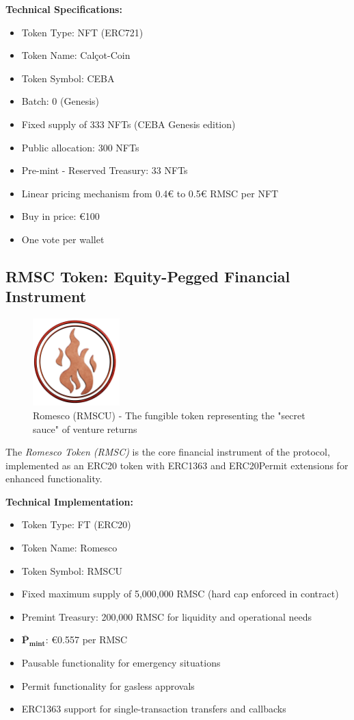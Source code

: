 \documentclass[conference]{IEEEtran}
\begin{document}
\textbf{Technical Specifications:}
\begin{itemize}
    \item Token Type: NFT (ERC721)
    \item Token Name: Calçot-Coin
    \item Token Symbol: CEBA
    \item Batch: 0 (Genesis)
    \item Fixed supply of 333 NFTs (CEBA Genesis edition)
    \item Public allocation: 300 NFTs
    \item Pre-mint - Reserved Treasury: 33 NFTs
    \item Linear pricing mechanism from 0.4€ to 0.5€ RMSC per NFT
    \item Buy in price: €100 
    \item One vote per wallet 
\end{itemize}


\subsection{RMSC Token: Equity-Pegged Financial Instrument}

\begin{figure}[ht]
\centering
\includegraphics[width=0.3\textwidth]{rmsc_logo.png}
\caption{Romesco (RMSCU) - The fungible token representing the "secret sauce" of venture returns}
\label{fig:rmsc-logo}
\end{figure}

The \textit{Romesco Token (RMSC)} is the core financial instrument of the protocol, implemented as an ERC20 token with ERC1363 and ERC20Permit extensions for enhanced functionality.

\textbf{Technical Implementation:}
\begin{itemize}
    \item Token Type: FT (ERC20)
    \item Token Name: Romesco
    \item Token Symbol: RMSCU
    \item Fixed maximum supply of 5,000,000 RMSC (hard cap enforced in contract)
    \item Premint Treasury: 200,000 RMSC for liquidity and operational needs
    \item $\boldsymbol{\overline{P}_\textbf{mint}}$: €0.557 per RMSC
    \item Pausable functionality for emergency situations
    \item Permit functionality for gasless approvals
    \item ERC1363 support for single-transaction transfers and callbacks
\end{itemize}
\end{document}
